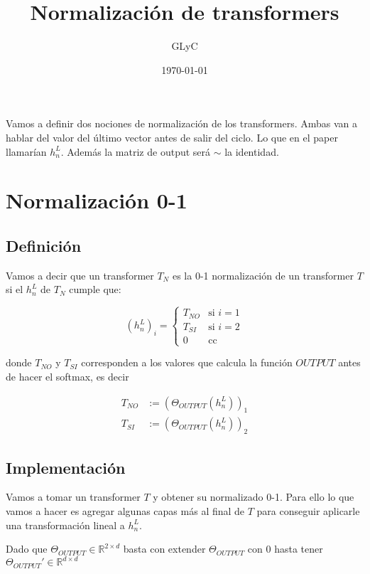 \documentclass{article}
\title{Normalización de transformers}
\author{GLyC}
\date{\today}
\begin{document}
\maketitle

Vamos a definir dos nociones de normalización de los transformers. Ambas van a hablar del valor del último vector antes de salir del ciclo. Lo que en el paper llamarían $h_n^L$. Además la matriz de output será $\sim$ la identidad.

\section*{Normalización 0-1}

\subsection*{Definición}

Vamos a decir que un transformer $T_N$ es la 0-1 normalización de un transformer $T$ si el $h_n^L$ de $T_N$ cumple que:

\begin{equation*}
(h_n^L)_i =
\begin{cases}
T_{NO} & \text{si } i = 1 \\
T_{SI} & \text{si } i = 2 \\
0 & \text{cc }
\end{cases}
\end{equation*}

donde $T_{NO}$ y $T_{SI}$ corresponden a los valores que calcula la función $OUTPUT$ antes de hacer el softmax, es decir 

\begin{align*}
    T_{NO} &:= (\Theta_{OUTPUT}(h_n^L))_1 \\
    T_{SI} &:= (\Theta_{OUTPUT}(h_n^L))_2 
\end{align*}


\subsection*{Implementación}

Vamos a tomar un transformer $T$ y obtener su normalizado 0-1. Para ello lo que vamos a hacer es agregar algunas capas más al final de $T$ para conseguir aplicarle una transformación lineal a $h_n^L$.

Dado que $\Theta_{OUTPUT} \in \mathbb{R}^{2\times d}$ basta con extender $\Theta_{OUTPUT}$ con $0$ hasta tener $\Theta_{OUTPUT}' \in \mathbb{R}^{d\times d}$
\end{document}
